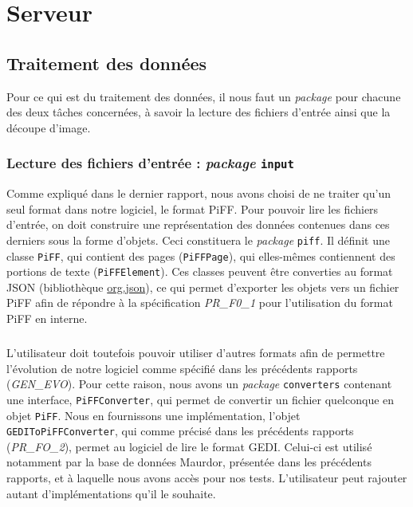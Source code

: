 \chapter{Serveur}

\section{Traitement des données}

Pour ce qui est du traitement des données, il nous faut un \textit{package} pour chacune des deux tâches concernées, à savoir la lecture des fichiers d'entrée ainsi que la découpe d'image.

\subsection{Lecture des fichiers d'entrée : \textit{package} \texttt{input}}

Comme expliqué dans le dernier rapport, nous avons choisi de ne traiter qu'un seul format dans notre logiciel, le format PiFF. Pour pouvoir lire les fichiers d'entrée, on doit construire une représentation des données contenues dans ces derniers sous la forme d'objets. Ceci constituera le \textit{package} \texttt{piff}. Il définit une classe \texttt{PiFF}, qui contient des pages (\texttt{PiFFPage}), qui elles-mêmes contiennent des portions de texte (\texttt{PiFFElement}). Ces classes peuvent être converties au format JSON (bibliothèque \href{https://mvnrepository.com/artifact/org.json/json}{org.json}), ce qui permet d'exporter les objets vers un fichier PiFF afin de répondre à la spécification \textit{PR\_F0\_1} pour l'utilisation du format PiFF en interne.

\paragraph{}
L'utilisateur doit toutefois pouvoir utiliser d'autres formats afin de permettre l'évolution de notre logiciel comme spécifié dans les précédents rapports (\textit{GEN\_EVO}). Pour cette raison, nous avons un \textit{package} \texttt{converters} contenant une interface, \texttt{PiFFConverter}, qui permet de convertir un fichier quelconque en objet \texttt{PiFF}. Nous en fournissons une implémentation, l'objet \texttt{GEDIToPiFFConverter}, qui comme précisé dans les précédents rapports (\textit{PR\_FO\_2}), permet au logiciel de lire le format GEDI. Celui-ci est utilisé notamment par la base de données Maurdor, présentée dans les précédents rapports, et à laquelle nous avons accès pour nos tests. L'utilisateur peut rajouter autant d'implémentations qu'il le souhaite.

